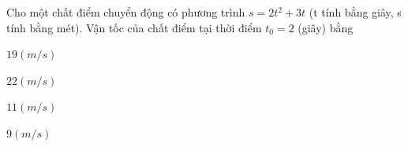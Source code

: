 \begin{question}[type=multiple_choice,difficulty=2,code={I-4}]
Cho một chất điểm chuyển động có phương trình $s = 2t^2 + 3t$ (t tính bằng giây, s tính bằng mét). Vận tốc của chất điểm tại thời điểm $t_0 = 2$ (giây) bằng

\begin{choice}[label=A]
$19(m/s)$
\end{choice}

\begin{choice}[label=B]
$22(m/s)$
\end{choice}

\begin{choice}[correct,label=C]
$11(m/s)$
\end{choice}

\begin{choice}[label=D]
$9(m/s)$
\end{choice}

\end{question}